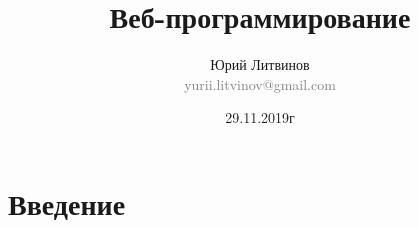 \documentclass[xetex,mathserif,serif]{beamer}
\title{Веб-программирование}
\author[Юрий Литвинов]{Юрий Литвинов\\\small{\textcolor{gray}{yurii.litvinov@gmail.com}}}
\date{29.11.2019г}
\begin{document}
	\frame{\titlepage}



	\section{Введение}
\end{document}
